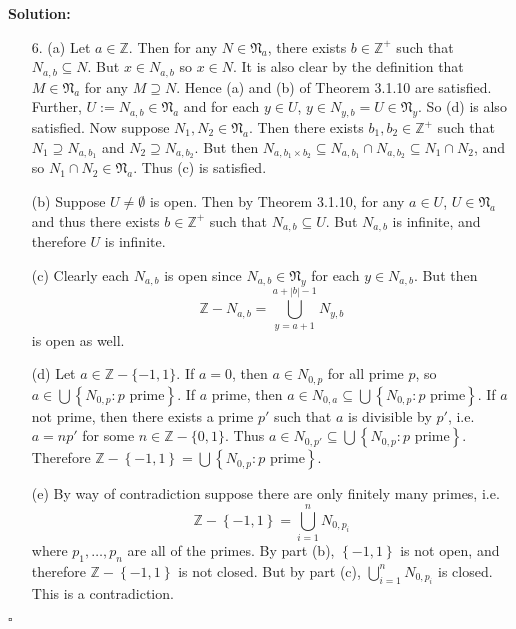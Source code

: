 \documentclass[12pt]{article}
\newcounter{ProofCounter}
\newenvironment{Solution}{\stepcounter{ProofCounter}\textbf{Solution:}}{\hfill$\square$}
\begin{document}
\begin{Solution}
\begin{enumerate}
    \item[6.] (a) Let $a \in \mathbb{Z}$. Then for any $N \in \mathfrak{N}_a$, there exists $b \in \mathbb{Z^+}$ such that $N_{a,b} \subseteq N$. But $x
      \in N_{a,b}$ so $x \in N$. It is also clear by the definition that $M \in \mathfrak{N}_{a}$ for any $M \supseteq N$. Hence (a) and (b) of
      Theorem 3.1.10 are satisfied. Further, $U := N_{a,b} \in \mathfrak{N}_a$ and for each $y \in U$, $y \in N_{y,b} = U \in \mathfrak{N}_{y}$. So
      (d) is also satisfied.
      Now suppose $N_1, N_2 \in \mathfrak{N}_a$. Then there exists $b_1, b_2 \in \mathbb{Z^+}$ such that $N_1 \supseteq N_{a,b_1}$ and $N_2\supseteq
      N_{a,b_2}$. But then $N_{a,b_1\times b_2} \subseteq N_{a,b_1}\cap N_{a,b_2} \subseteq N_1\cap N_2$, and so $N_1\cap N_2 \in \mathfrak{N}_a$.
      Thus (c) is satisfied.

      (b) Suppose $U \neq \emptyset$ is open. Then by Theorem 3.1.10, for any $a \in U$, $U \in \mathfrak{N}_{a}$ and thus there exists $b \in
      \mathbb{Z}^+$ such that
      $N_{a,b} \subseteq U$. But $N_{a,b}$ is infinite, and therefore $U$ is infinite.

      (c) Clearly each $N_{a,b}$ is open since $N_{a,b} \in \mathfrak{N}_{y}$ for each $y \in N_{a,b}$. But then
      \[
        \mathbb{Z} - N_{a,b} = \bigcup_{y=a+1}^{a+|b|-1}N_{y,b}
      \]
      is open as well.

      (d) Let $a \in \mathbb{Z} - \{-1,1\}$. If $a = 0$, then $a \in N_{0,p}$ for all prime $p$, so $a \in \bigcup \left\{ N_{0,p} : p \text{ prime}
      \right\}$.
      If $a$ prime, then $a \in N_{0,a} \subseteq \bigcup \left\{ N_{0,p} : p \text{ prime} \right\}$. If $a$ not
      prime, then there exists a prime $p'$ such that $a$ is divisible by $p'$, i.e. $a = np'$ for some $n \in \mathbb{Z} - \{0, 1\}$.
      Thus $a \in N_{0,p'} \subseteq \bigcup\left\{ N_{0,p} : p \text{ prime} \right\}$. Therefore $\mathbb{Z} - \left\{ -1,1 \right\} = \bigcup
      \left\{ N_{0,p} : p \text{ prime} \right\}$.

      (e) By way of contradiction suppose there are only finitely many primes, i.e. 
      \[
        \mathbb{Z} - \left\{ -1,1 \right\} = \bigcup_{i=1}^{n}N_{0,p_i}
      \]
      where $p_1, \dots, p_n$ are all of the primes.
      By part (b), $\left\{ -1,1 \right\}$ is not open, and therefore $\mathbb{Z} - \left\{ -1,1 \right\}$ is not closed.
      But by part (c), $\bigcup_{i=1}^{n}N_{0,p_i}$ is closed. This is a contradiction.
  \end{enumerate}
\end{Solution}
\end{document}
